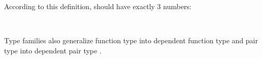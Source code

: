 According to this definition,    should have exactly 3 numbers:

\begin{code}%
\>[0]\AgdaSpace{}%
\AgdaSymbol{:}\AgdaSpace{}%
\AgdaSpace{}%
\AgdaSpace{}%
\<%
\\
\>[0]\AgdaSpace{}%
\AgdaSymbol{=}\AgdaSpace{}%
\AgdaSpace{}%
\AgdaSpace{}%
\AgdaSpace{}%
\AgdaSpace{}%
\AgdaSpace{}%
\AgdaSpace{}%
\AgdaInductiveConstructor{[]}\<%
\end{code}

Type families also generalize function type  into dependent function type  and pair type  into dependent pair type .

\begin{code}%
\>[0]\AgdaSpace{}%
\AgdaSymbol{:}\AgdaSpace{}%
\AgdaSymbol{(}\AgdaSpace{}%
\AgdaSymbol{:}\AgdaSpace{}%
\AgdaSymbol{)}\AgdaSpace{}%
\AgdaSymbol{(}\AgdaSpace{}%
\AgdaSymbol{:}\AgdaSpace{}%
\AgdaSpace{}%
\AgdaSpace{}%
\AgdaSymbol{)}\AgdaSpace{}%
\AgdaSpace{}%
\<%
\\
\>[0]\AgdaSpace{}%
\AgdaSpace{}%
\AgdaSpace{}%
\AgdaSymbol{=}\AgdaSpace{}%
\AgdaSymbol{(}\AgdaSpace{}%
\AgdaSymbol{:}\AgdaSpace{}%
\AgdaSymbol{)}\AgdaSpace{}%
\AgdaSpace{}%
\AgdaSpace{}%
\<%
\\
%
\\[\AgdaEmptyExtraSkip]%
\>[0]\AgdaSpace{}%
\AgdaSpace{}%
\AgdaSymbol{(}\AgdaSpace{}%
\AgdaSymbol{:}\AgdaSpace{}%
\AgdaSymbol{)}\AgdaSpace{}%
\AgdaSymbol{(}\AgdaSpace{}%
\AgdaSymbol{:}\AgdaSpace{}%
\AgdaSpace{}%
\AgdaSpace{}%
\AgdaSymbol{)}\AgdaSpace{}%
\AgdaSymbol{:}\AgdaSpace{}%
\AgdaSpace{}%
\<%
\\
\>[0][@{}l@{\AgdaIndent{0}}]%
\>[2]\AgdaSpace{}%
\AgdaOperator{\AgdaInductiveConstructor{\AgdaUnderscore{},\AgdaUnderscore{}}}\<%
\\
%
\>[2]\<%
\\
\>[2][@{}l@{\AgdaIndent{0}}]%
\>[4]\AgdaSpace{}%
\AgdaSymbol{:}\AgdaSpace{}%
\<%
\\
%
\>[4]\AgdaSpace{}%
\AgdaSymbol{:}\AgdaSpace{}%
\AgdaSpace{}%
\<%
\end{code}

